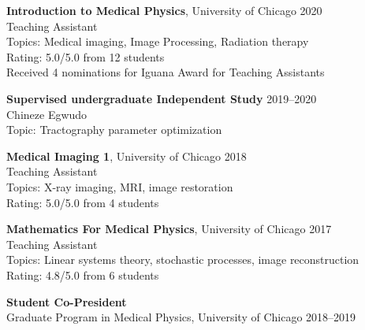 \documentclass[10pt,letterpaper]{article}
\begin{document}
\begin{benumerate}{4}

\item
  \textbf{Introduction to Medical Physics}, University of Chicago \hfill 2020\\
  Teaching Assistant\\
  Topics: Medical imaging, Image Processing, Radiation therapy\\
  Rating: 5.0/5.0 from 12 students\\
  Received 4 nominations for Iguana Award for Teaching Assistants
\item
  \textbf{Supervised undergraduate Independent Study} \hfill 2019--2020\\
  Chineze Egwudo\\
  Topic: Tractography parameter optimization
  
\item
  \textbf{Medical Imaging 1}, University of Chicago \hfill 2018\\
  Teaching Assistant\\
  Topics: X-ray imaging, MRI, image restoration\\
  Rating: 5.0/5.0 from 4 students
\item
  \textbf{Mathematics For Medical Physics}, University of Chicago \hfill 2017\\
  Teaching Assistant\\
  Topics: Linear systems theory, stochastic processes, image reconstruction\\
  Rating: 4.8/5.0 from 6 students
\end{benumerate}

\begin{benumerate}{1}
\item
  \textbf{Student Co-President}\\
  Graduate Program in Medical Physics, University of Chicago \hfill 2018--2019
\end{benumerate}
\end{document}
